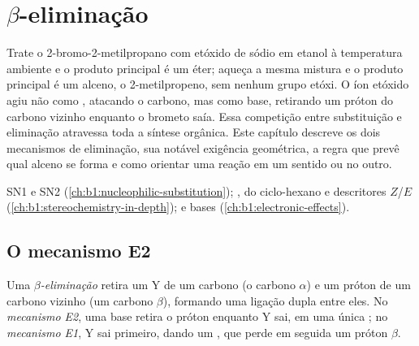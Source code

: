\chapter{\texorpdfstring{$\beta$}{Beta}-eliminação}\label{ch:b1:elimination}

Trate o 2-bromo-2-metilpropano com etóxido de sódio em etanol à
temperatura ambiente e o produto principal é um éter; aqueça a mesma
mistura e o produto principal é um alceno, o 2-metilpropeno, sem nenhum
grupo etóxi. O íon etóxido agiu não como , atacando o carbono,
mas como base, retirando um próton do carbono vizinho enquanto o brometo
saía. Essa competição entre substituição e eliminação atravessa toda a
síntese orgânica. Este capítulo descreve os dois mecanismos de
eliminação, sua notável exigência geométrica, a regra que prevê qual
alceno se forma e como orientar uma reação em um sentido ou no outro.

\begin{recall}
SN1 e SN2 (\cref{ch:b1:nucleophilic-substitution}); ,
 do ciclo-hexano e descritores $Z$/$E$
(\cref{ch:b1:stereochemistry-in-depth});  e bases
(\cref{ch:b1:electronic-effects}).
\end{recall}

\section{O mecanismo E2}

\begin{definition}\label{def:b1:elimination:elimination}
Uma \emph{$\beta$-eliminação} retira um 
Y de um carbono (o carbono $\alpha$) e um próton de um carbono vizinho
(um carbono $\beta$), formando uma ligação dupla entre eles. No
\emph{mecanismo E2}, uma base retira o próton enquanto
Y sai, em uma única ; no \emph{mecanismo
E1}, Y sai primeiro, dando um , que perde
em seguida um próton $\beta$.
\end{definition}

